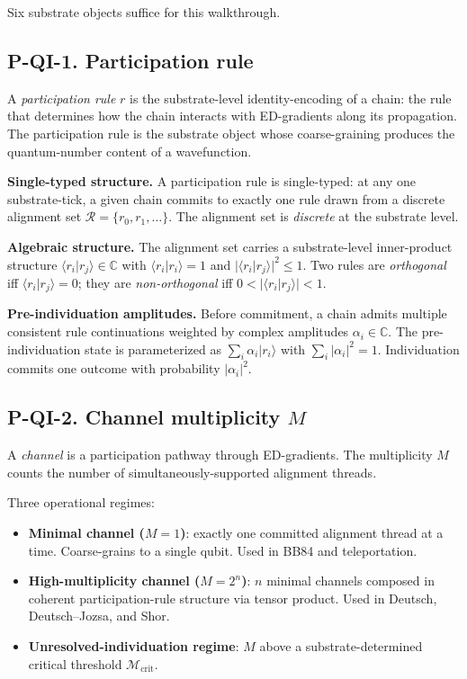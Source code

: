 \documentclass[11pt,a4paper]{article}
\begin{document}
Six substrate objects suffice for this walkthrough.

\subsection{P-QI-1. Participation rule}

A \emph{participation rule} $r$ is the substrate-level identity-encoding of a chain: the rule that determines how the chain interacts with ED-gradients along its propagation. The participation rule is the substrate object whose coarse-graining produces the quantum-number content of a wavefunction.

\textbf{Single-typed structure.} A participation rule is single-typed: at any one substrate-tick, a given chain commits to exactly one rule drawn from a discrete alignment set $\mathcal{R} = \{r_0, r_1, \ldots\}$. The alignment set is \emph{discrete} at the substrate level.

\textbf{Algebraic structure.} The alignment set carries a substrate-level inner-product structure $\langle r_i | r_j\rangle \in \mathbb{C}$ with $\langle r_i | r_i\rangle = 1$ and $|\langle r_i | r_j\rangle|^2 \leq 1$. Two rules are \emph{orthogonal} iff $\langle r_i | r_j\rangle = 0$; they are \emph{non-orthogonal} iff $0 < |\langle r_i | r_j\rangle| < 1$.

\textbf{Pre-individuation amplitudes.} Before commitment, a chain admits multiple consistent rule continuations weighted by complex amplitudes $\alpha_i \in \mathbb{C}$. The pre-individuation state is parameterized as $\sum_i \alpha_i|r_i\rangle$ with $\sum_i|\alpha_i|^2 = 1$. Individuation commits one outcome with probability $|\alpha_i|^2$.

\subsection{P-QI-2. Channel multiplicity $M$}

A \emph{channel} is a participation pathway through ED-gradients. The multiplicity $M$ counts the number of simultaneously-supported alignment threads.

Three operational regimes:

\begin{itemize}[noitemsep]
  \item \textbf{Minimal channel ($M = 1$)}: exactly one committed alignment thread at a time. Coarse-grains to a single qubit. Used in BB84 and teleportation.
  \item \textbf{High-multiplicity channel ($M = 2^n$)}: $n$ minimal channels composed in coherent participation-rule structure via tensor product. Used in Deutsch, Deutsch--Jozsa, and Shor.
  \item \textbf{Unresolved-individuation regime}: $M$ above a substrate-determined critical threshold $\mathcal{M}_{\mathrm{crit}}$.
\end{itemize}
\end{document}
